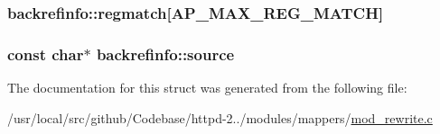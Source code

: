 \subsubsection[{\texorpdfstring{regmatch}{regmatch}}]{ backrefinfo\+::regmatch\mbox{[}{\bf A\+P\+\_\+\+M\+A\+X\+\_\+\+R\+E\+G\+\_\+\+M\+A\+T\+CH}\mbox{]}}\hypertarget{structbackrefinfo_ab9e9fc7fdcbb9ff2cd7dc42d3a8d393f}{}\label{structbackrefinfo_ab9e9fc7fdcbb9ff2cd7dc42d3a8d393f}
\subsubsection[{\texorpdfstring{source}{source}}]{\setlength{\rightskip}{0pt plus 5cm}const char$\ast$ backrefinfo\+::source}\hypertarget{structbackrefinfo_a0f12e2e2929e64a0beb224ed28c988ea}{}\label{structbackrefinfo_a0f12e2e2929e64a0beb224ed28c988ea}


The documentation for this struct was generated from the following file\+:\begin{DoxyCompactItemize}
\item 
/usr/local/src/github/\+Codebase/httpd-\/2../modules/mappers/\hyperlink{mod__rewrite_8c}{mod\+\_\+rewrite.\+c}\end{DoxyCompactItemize}
